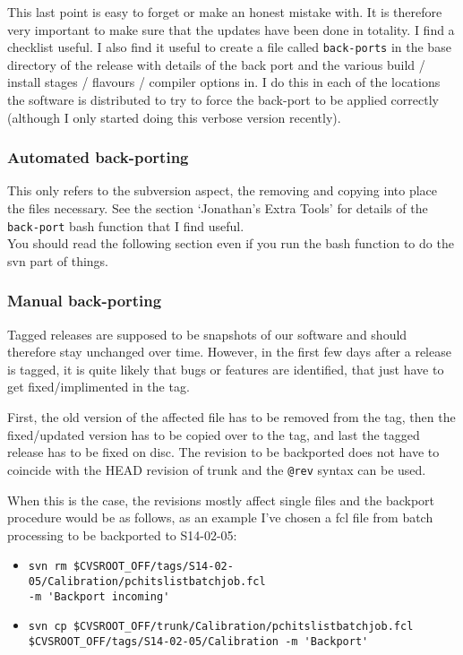 \documentclass[letterpaper,10pt]{article}
\begin{document}
\noindent
This last point is easy to forget or make an honest mistake with. It is therefore very important to make sure that the updates have been done in totality. I find a checklist useful. I also find it useful to create a file called \verb|back-ports| in the base directory of the release with details of the back port and the various build / install stages / flavours / compiler options in. I do this in each of the locations the software is distributed to try to force the back-port to be applied correctly (although I only started doing this verbose version recently).


\subsubsection{Automated back-porting}

This only refers to the subversion aspect, the removing and copying into place the files necessary.  See the section `Jonathan's Extra Tools' for details of the \verb|back-port| bash function that I find useful. \\

\noindent
You should read the following section even if you run the bash function to do the svn part of things.

\subsubsection{Manual back-porting}

Tagged releases are supposed to be snapshots of our software and should therefore stay unchanged over time. However, in the first few days after a release is tagged, it is quite likely that bugs or features are identified, that just have to get fixed/implimented in the tag. 

First, the old version of the affected file has to be removed from the tag, then the fixed/updated version has to be copied over to the tag, and last the tagged release has to be fixed on disc. The revision to be backported does not have to coincide with the HEAD revision of trunk and the \verb|@rev| syntax can be used.

When this is the case, the revisions mostly affect single files and the backport procedure would be as follows, as an example I've chosen a fcl file from batch processing to be backported to S14-02-05:
\begin{itemize}
\item \verb|svn rm $CVSROOT_OFF/tags/S14-02-05/Calibration/pchitslistbatchjob.fcl|\\
  \verb|-m 'Backport incoming'|
\item \verb|svn cp $CVSROOT_OFF/trunk/Calibration/pchitslistbatchjob.fcl|\\
  \verb|$CVSROOT_OFF/tags/S14-02-05/Calibration -m 'Backport'|
\end{itemize}
\end{document}
